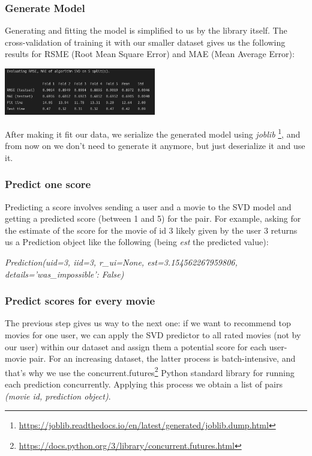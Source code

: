 \subsubsection*{Generate Model}
Generating and fitting the model is simplified to us by the library itself.
The cross-validation of training it with our smaller dataset gives us the following results for RSME (Root Mean Square Error) and MAE (Mean Average Error):\\
\begin{center}
    \captionsetup{type=figure}
    \includegraphics[width=250px]{images/svd-val.png}
\end{center}
After making it fit our data, we serialize the generated model using \emph{joblib}
\footnote{\href{https://joblib.readthedocs.io/en/latest/generated/joblib.dump.html}{https://joblib.readthedocs.io/en/latest/generated/joblib.dump.html}},
and from now on we don't need to generate it anymore, but just deserialize it and use it.
\subsubsection*{Predict one score}
Predicting a score involves sending a user and a movie to the SVD model and getting a predicted score (between 1 and 5) for the pair.
For example, asking for the estimate of the score for the movie of id 3 likely given by the user 3 returns us a Prediction object like the following (being \emph{est} the predicted value):
\begin{center}
    \emph{Prediction(uid=3, iid=3, r\_ui=None, est=3.154562267959806, details={'was\_impossible': False})}
\end{center}
\subsubsection*{Predict scores for every movie}
The previous step gives us way to the next one:
if we want to recommend top movies for one user, we can apply the SVD predictor to all rated movies (not by our user) within our dataset
and assign them a potential score for each user-movie pair.
For an increasing dataset, the latter process is batch-intensive, and that's why we use the concurrent.futures\footnote{\href{https://docs.python.org/3/library/concurrent.futures.html}{https://docs.python.org/3/library/concurrent.futures.html}}
Python standard library for running each prediction concurrently.
Applying this process we obtain a list of pairs \emph{(movie id, prediction object)}.

